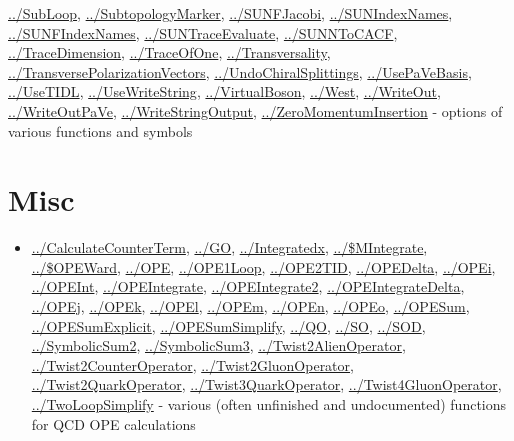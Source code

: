 \documentclass[../FeynCalcManual.tex]{subfiles}
\begin{document}
\begin{itemize}
  \hyperlink{../subloop}{../SubLoop},
  \hyperlink{../subtopologymarker}{../SubtopologyMarker},
  \hyperlink{../sunfjacobi}{../SUNFJacobi},
  \hyperlink{../sunindexnames}{../SUNIndexNames},
  \hyperlink{../sunfindexnames}{../SUNFIndexNames},
  \hyperlink{../suntraceevaluate}{../SUNTraceEvaluate},
  \hyperlink{../sunntocacf}{../SUNNToCACF},
  \hyperlink{../tracedimension}{../TraceDimension},
  \hyperlink{../traceofone}{../TraceOfOne},
  \hyperlink{../transversality}{../Transversality},
  \hyperlink{../transversepolarizationvectors}{../TransversePolarizationVectors},
  \hyperlink{../undochiralsplittings}{../UndoChiralSplittings},
  \hyperlink{../usepavebasis}{../UsePaVeBasis},
  \hyperlink{../usetidl}{../UseTIDL},
  \hyperlink{../usewritestring}{../UseWriteString},
  \hyperlink{../virtualboson}{../VirtualBoson},
  \hyperlink{../west}{../West}, \hyperlink{../writeout}{../WriteOut},
  \hyperlink{../writeoutpave}{../WriteOutPaVe},
  \hyperlink{../writestringoutput}{../WriteStringOutput},
  \hyperlink{../zeromomentuminsertion}{../ZeroMomentumInsertion} -
  options of various functions and symbols
\end{itemize}

\hypertarget{misc}{
\section{Misc}\label{misc}}

\begin{itemize}
\tightlist
\item
  \hyperlink{../calculatecounterterm}{../CalculateCounterTerm},
  \hyperlink{../go}{../GO}, \hyperlink{../integratedx}{../Integratedx},
  \hyperlink{../dollarmintegrate}{../\$MIntegrate},
  \hyperlink{../dollaropeward}{../\$OPEWard},
  \hyperlink{../ope}{../OPE}, \hyperlink{../ope1loop}{../OPE1Loop},
  \hyperlink{../ope2tid}{../OPE2TID},
  \hyperlink{../opedelta}{../OPEDelta}, \hyperlink{../opei}{../OPEi},
  \hyperlink{../opeint}{../OPEInt},
  \hyperlink{../opeintegrate}{../OPEIntegrate},
  \hyperlink{../opeintegrate2}{../OPEIntegrate2},
  \hyperlink{../opeintegratedelta}{../OPEIntegrateDelta},
  \hyperlink{../opej}{../OPEj}, \hyperlink{../opek}{../OPEk},
  \hyperlink{../opel}{../OPEl}, \hyperlink{../opem}{../OPEm},
  \hyperlink{../open}{../OPEn}, \hyperlink{../opeo}{../OPEo},
  \hyperlink{../opesum}{../OPESum},
  \hyperlink{../opesumexplicit}{../OPESumExplicit},
  \hyperlink{../opesumsimplify}{../OPESumSimplify},
  \hyperlink{../qo}{../QO}, \hyperlink{../so}{../SO},
  \hyperlink{../sod}{../SOD},
  \hyperlink{../symbolicsum2}{../SymbolicSum2},
  \hyperlink{../symbolicsum3}{../SymbolicSum3},
  \hyperlink{../twist2alienoperator}{../Twist2AlienOperator},
  \hyperlink{../twist2counteroperator}{../Twist2CounterOperator},
  \hyperlink{../twist2gluonoperator}{../Twist2GluonOperator},
  \hyperlink{../twist2quarkoperator}{../Twist2QuarkOperator},
  \hyperlink{../twist3quarkoperator}{../Twist3QuarkOperator},
  \hyperlink{../twist4gluonoperator}{../Twist4GluonOperator},
  \hyperlink{../twoloopsimplify}{../TwoLoopSimplify} - various (often
  unfinished and undocumented) functions for QCD OPE calculations
\end{itemize}
\end{document}
